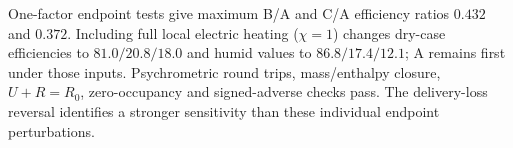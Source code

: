 One-factor endpoint tests give maximum B/A and C/A efficiency ratios $0.432$ and $0.372$. Including full local electric heating ($\chi=1$) changes dry-case efficiencies to $81.0/20.8/18.0$ and humid values to $86.8/17.4/12.1$; A remains first under those inputs. Psychrometric round trips, mass/enthalpy closure, $U+R=R_0$, zero-occupancy and signed-adverse checks pass. The delivery-loss reversal identifies a stronger sensitivity than these individual endpoint perturbations.


